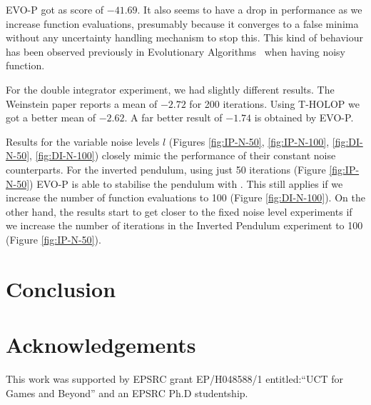 \documentclass[conference]{IEEEtran}
\begin{document}
 EVO-P got as score of $-41.69$. It also  seems to have a drop in performance as we increase function evaluations, presumably because it converges to a false minima without any uncertainty handling mechanism to stop this. This kind of behaviour has been observed previously in Evolutionary Algorithms~\cite{hansen2009tec} when having noisy function.

For the double integrator experiment, we had slightly different results. The Weinstein paper reports a mean of $-2.72$ for 200 iterations. Using T-HOLOP we got a better mean of $-2.62$. A far better result of $-1.74$ is obtained by EVO-P. 


Results for the variable noise levels $l$ (Figures \ref{fig:IP-N-50}, \ref{fig:IP-N-100}, \ref{fig:DI-N-50}, \ref{fig:DI-N-100}) closely mimic the performance of their constant noise counterparts. For the inverted pendulum, using just 50 iterations (Figure \ref{fig:IP-N-50}) EVO-P is able to stabilise the pendulum with . This still applies if we increase the number of function evaluations to 100 (Figure \ref{fig:DI-N-100}). On the other hand, the results start to get closer to the fixed noise level experiments if we increase the number of iterations in the Inverted Pendulum experiment to 100 (Figure \ref{fig:IP-N-50}).




\section{Conclusion} \label{sec:conclusion}

 
\section*{Acknowledgements}
This work was supported by EPSRC grant EP/H048588/1 entitled:``UCT for Games and Beyond'' and an EPSRC Ph.D studentship. 





\end{document}

